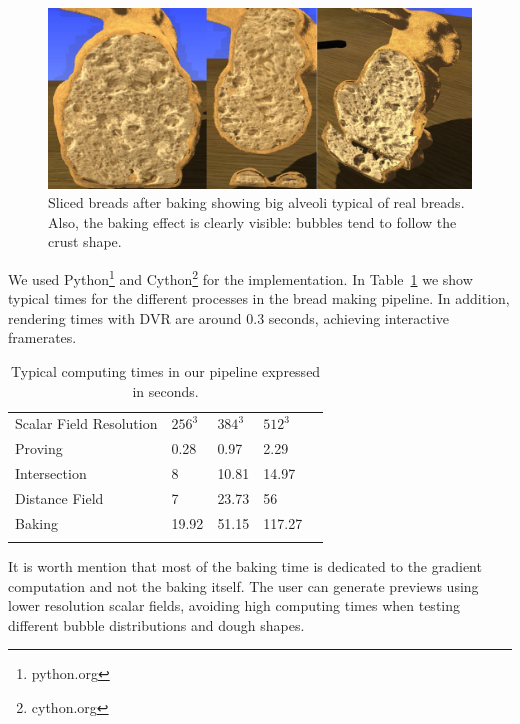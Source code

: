 \begin{figure}[!ht]
\begin{center}
\includegraphics[width=13cm]{figures/bakedbunny}
\caption{Sliced breads after baking showing big alveoli typical of real breads. Also, the baking effect is clearly visible: bubbles tend to follow the crust shape.}
\label{fg:bakedbunny}
\end{center}
\end{figure}


We used Python\footnote{python.org} and Cython\footnote{cython.org} for the implementation.
In Table~\ref{tab:computingtimes} we show typical times for the different processes in the bread making pipeline. In addition, rendering times with DVR are around $0.3$ seconds, achieving interactive framerates.

\begin{table}[h!]
\begin{tabular}{lllll}
\hline\noalign{\smallskip}
Scalar Field Resolution & $256^{3}$ & $384^{3}$  & $512^{3}$ \\
\noalign{\smallskip}\hline\noalign{\smallskip}
Proving & 0.28 & 0.97 & 2.29 \\
Intersection & 8 & 10.81 & 14.97 \\
Distance Field & 7 & 23.73 & 56 \\
Baking & 19.92 & 51.15 & 117.27 \\
\noalign{\smallskip}\hline
\end{tabular}
\caption{Typical computing times in our pipeline expressed in seconds.}
\label{tab:computingtimes}
\end{table}


It is worth mention that most of the baking time is dedicated to the gradient computation and not the baking itself.
The user can generate previews using lower resolution scalar fields, avoiding high computing times when testing different bubble distributions and dough shapes.

